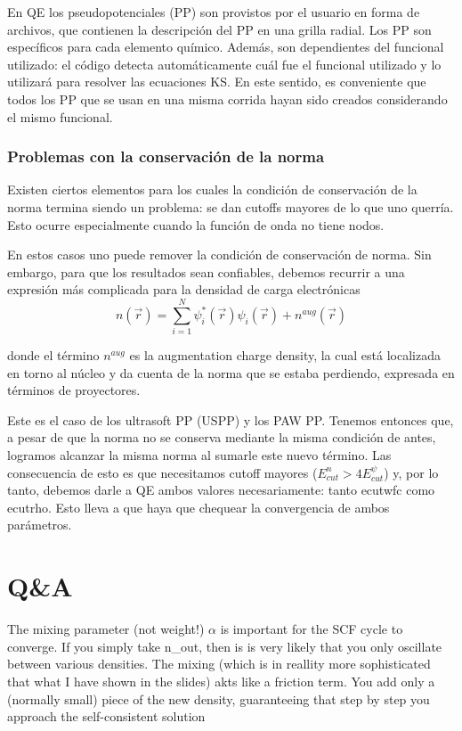   En QE los pseudopotenciales (PP) son provistos por el usuario en forma de archivos, que contienen la descripción del PP en una grilla radial. Los PP son específicos para cada elemento químico. Además, son dependientes del funcional utilizado: el código detecta automáticamente cuál fue el funcional utilizado y lo utilizará para resolver las ecuaciones KS. En este sentido, es conveniente que todos los PP que se usan en una misma corrida hayan sido creados considerando el mismo funcional.

\subsubsection{Problemas con la conservación de la norma}

  Existen ciertos elementos para los cuales la condición de conservación de la norma termina siendo un problema: se dan cutoffs mayores de lo que uno querría. Esto ocurre especialmente cuando la función de onda no tiene nodos.

  En estos casos uno puede remover la condición de conservación de norma. Sin embargo, para que los resultados sean confiables, debemos recurrir a una expresión más complicada para la densidad de carga electrónicas
    $$n (\vec{r}) = \sum_{i=1}^N \psi_i^{*} (\vec{r}) \psi_i (\vec{r}) + n^{aug} (\vec{r})$$

  donde el término $n^{aug}$ es la augmentation charge density, la cual está localizada en torno al núcleo y da cuenta de la norma que se estaba perdiendo, expresada en términos de proyectores.

  Este es el caso de los ultrasoft PP (USPP) y los PAW PP. Tenemos entonces que, a pesar de que la norma no se conserva mediante la misma condición de antes, logramos alcanzar la misma norma al sumarle este nuevo término. Las consecuencia de esto es que necesitamos cutoff mayores ($E_{cut}^{n} > 4 E_{cut}^{\psi}$) y, por lo tanto, debemos darle a QE ambos valores necesariamente: tanto ecutwfc como ecutrho. Esto lleva a que haya que chequear la convergencia de ambos parámetros.

\section{Q\&A}


  The mixing parameter (not weight!) $\alpha$ is important for the SCF cycle to converge. If you simply take n\_out, then is is very likely that you only oscillate between various densities. The mixing (which is in reallity more sophisticated that what I have shown in the slides) akts like a friction term. You add only a (normally small) piece of the new density, guaranteeing that step by step you approach the self-consistent solution

